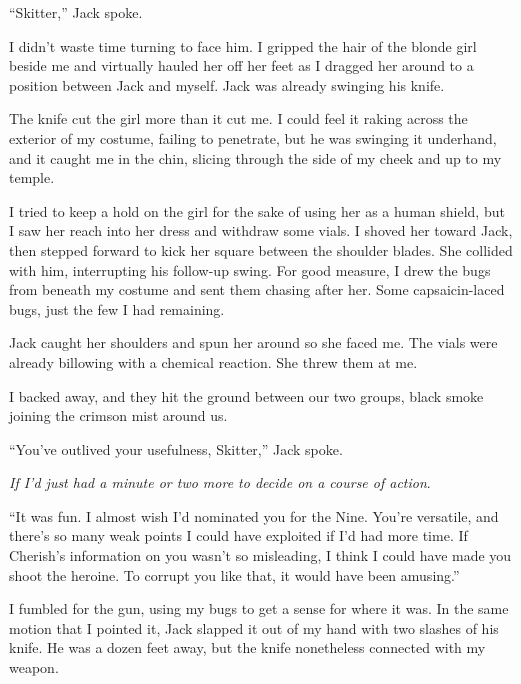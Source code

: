 ``Skitter,'' Jack spoke.



I didn't waste time turning to face him.  I gripped the hair of the blonde girl beside me and virtually hauled her off her feet as I dragged her around to a position between Jack and myself.  Jack was already swinging his knife.



The knife cut the girl more than it cut me.  I could feel it raking across the exterior of my costume, failing to penetrate, but he was swinging it underhand, and it caught me in the chin, slicing through the side of my cheek and up to my temple.



I tried to keep a hold on the girl for the sake of using her as a human shield, but I saw her reach into her dress and withdraw some vials.  I shoved her toward Jack, then stepped forward to kick her square between the shoulder blades.  She collided with him, interrupting his follow-up swing.  For good measure, I drew the bugs from beneath my costume and sent them chasing after her.  Some capsaicin-laced bugs, just the few I had remaining.



Jack caught her shoulders and spun her around so she faced me.  The vials were already billowing with a chemical reaction.  She threw them at me.



I backed away, and they hit the ground between our two groups, black smoke joining the crimson mist around us.



``You've outlived your usefulness, Skitter,'' Jack spoke.



\emph{If I'd just had a minute or two more to decide on a course of action}.



``It was fun.  I almost wish I'd nominated you for the Nine.  You're versatile, and there's so many weak points I could have exploited if I'd had more time.  If Cherish's information on you wasn't so misleading, I think I could have made you shoot the heroine.  To corrupt you like that, it would have been amusing.''



I fumbled for the gun, using my bugs to get a sense for where it was.  In the same motion that I pointed it, Jack slapped it out of my hand with two slashes of his knife.  He was a dozen feet away, but the knife nonetheless connected with my weapon.



